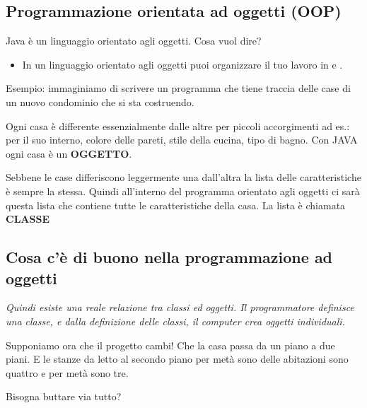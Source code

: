 \subsection{Programmazione orientata ad oggetti (OOP)}
\begin{frame}
\begin{block}{}
Java è un linguaggio orientato agli oggetti. Cosa vuol dire?
\end{block}
\begin{itemize}
\item In un linguaggio orientato agli oggetti puoi organizzare il tuo lavoro in  e .
\end{itemize}
Esempio: immaginiamo di scrivere un programma che tiene traccia delle case di un nuovo condominio che si sta costruendo.
\begin{block}{}
Ogni casa è differente essenzialmente dalle altre per piccoli accorgimenti ad es.: per il suo interno, colore delle pareti, stile della cucina, tipo di bagno. Con JAVA ogni casa è un \textbf{\alert{OGGETTO}}.
\end{block}
\pause
\begin{block}{}
Sebbene le case differiscono leggermente una dall'altra la lista delle caratteristiche è sempre la stessa. Quindi 
all'interno del programma orientato agli oggetti ci sarà questa lista che contiene tutte le caratteristiche
della casa. La lista è chiamata \textbf{\alert{CLASSE}}
\end{block}
\end{frame}

\subsection*{Cosa c'è di buono nella programmazione ad oggetti}
\begin{frame}
\begin{block}{}
\begin{center}
\itshape{Quindi esiste una reale relazione tra classi ed oggetti. Il programmatore definisce una classe, e dalla definizione
delle classi, il computer crea oggetti individuali.}
\end{center}
\end{block}
\pause
\begin{block}{}
Supponiamo ora che il progetto cambi! Che la casa passa da un piano a due piani. E le stanze da letto al secondo piano per metà
sono delle abitazioni sono quattro e per metà sono tre.
\end{block}
\pause
\begin{block}{}
Bisogna buttare via tutto?
\end{block}
\end{frame}

